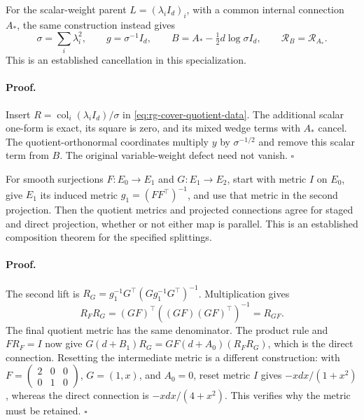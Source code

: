 For the scalar-weight parent \(L=(\lambda_i I_d)_i\), with a common
internal connection \(A_*\), the same construction instead gives
\begin{equation}
 \sigma=\sum_i\lambda_i^2,\qquad
 g=\sigma^{-1}I_d,\qquad
 B=A_*-\tfrac12d\log\sigma I_d,\qquad
 \mathcal R_B=\mathcal R_{A_*}.
\label{eq:rg-cover-scalar-weight-quotient}
\end{equation}
This is an established cancellation in this specialization.

\paragraph{Proof.}
Insert \(R=\operatorname{col}_i(\lambda_i I_d)/\sigma\) in
\cref{eq:rg-cover-quotient-data}. The additional scalar one-form is exact,
its square is zero, and its mixed wedge terms with \(A_*\) cancel.
The quotient-orthonormal coordinates multiply \(y\) by
\(\sigma^{-1/2}\) and remove this scalar term from \(B\).
The original variable-weight defect need not vanish. \(\square\)

For smooth surjections \(F:E_0\to E_1\) and \(G:E_1\to E_2\), start
with metric \(I\) on \(E_0\), give \(E_1\) its induced metric
\(g_1=(FF^\top)^{-1}\), and use that metric in the second projection.
Then the quotient metrics and projected connections agree for staged and
direct projection, whether or not either map is parallel. This is an
established composition theorem for the specified splittings.

\paragraph{Proof.}
The second lift is
\(R_G=g_1^{-1}G^\top(Gg_1^{-1}G^\top)^{-1}\). Multiplication gives
\begin{equation}
 R_FR_G=(GF)^\top((GF)(GF)^\top)^{-1}=R_{GF}.
\label{eq:rg-cover-quotient-lift-composition}
\end{equation}
The final quotient metric has the same denominator. The product rule and
\(FR_F=I\) now give
\(G(d+B_1)R_G=GF(d+A_0)(R_FR_G)\), which is the direct connection.
Resetting the intermediate metric is a different construction: with
\(F=\left(\begin{smallmatrix}2&0&0\\0&1&0\end{smallmatrix}\right)\),
\(G=(1,x)\), and \(A_0=0\), reset metric \(I\) gives
\(-x dx/(1+x^2)\), whereas the direct connection is
\(-x dx/(4+x^2)\). This verifies why the metric must be retained.
\(\square\)

